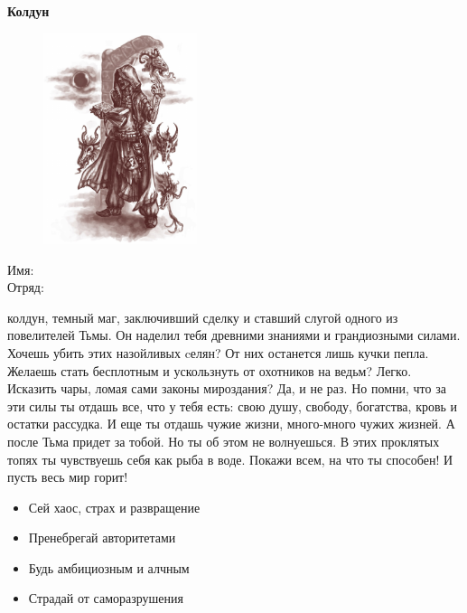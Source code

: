 \documentclass[10pt,twoside]{report}
\begin{document}
\thispagestyle{empty}
\begin{center}
{\LARGE \textbf{Колдун}}

\begin{figure}[H]
  \includegraphics[width=170px]{images/warlock.png}
\end{figure}

\end{center}
\begin{description}
\item[Имя:]\hfill
\item[Отряд:]\hfill
\end{description}
\pagebreak

{ колдун, темный маг, заключивший сделку и ставший слугой одного из повелителей Тьмы. Он наделил тебя древними знаниями и грандиозными силами. Хочешь убить этих назойливых cелян? От них останется лишь кучки пепла. Желаешь стать бесплотным и ускользнуть от охотников на ведьм? Легко. Исказить чары, ломая сами законы мироздания? Да, и не раз. Но помни, что за эти силы ты отдашь все, что у тебя есть: свою душу, свободу, богатства, кровь и остатки рассудка. И еще ты отдашь чужие жизни, много-много чужих жизней. А после Тьма придет за тобой. Но ты об этом не волнуешься. В этих проклятых топях ты чувствуешь себя как рыба в воде. Покажи всем, на что ты способен! И пусть весь мир горит!}
\begin{itemize}[noitemsep]
  \item Сей хаос, страх и развращение
  \item Пренебрегай авторитетами
  \item Будь амбициозным и алчным
  \item Страдай от саморазрушения
\end{itemize}
\pagebreak

\end{document}
